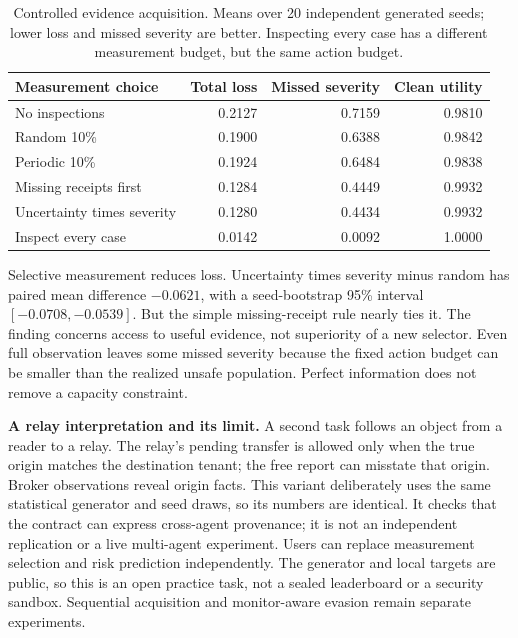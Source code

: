 \begin{table}[htbp]
\centering
\small
\caption{Controlled evidence acquisition. Means over 20 independent generated
seeds; lower loss and missed severity are better. Inspecting every case has a
different measurement budget, but the same action budget.}
\label{tab:evidence-integrity}
\begin{tabular}{lrrr}
\toprule
Measurement choice & Total loss & Missed severity & Clean utility \\
\midrule
No inspections & 0.2127 & 0.7159 & 0.9810 \\
Random 10\% & 0.1900 & 0.6388 & 0.9842 \\
Periodic 10\% & 0.1924 & 0.6484 & 0.9838 \\
Missing receipts first & 0.1284 & 0.4449 & 0.9932 \\
Uncertainty times severity & 0.1280 & 0.4434 & 0.9932 \\
Inspect every case & 0.0142 & 0.0092 & 1.0000 \\
\bottomrule
\end{tabular}
\end{table}

Selective measurement reduces loss. Uncertainty times severity minus random
has paired mean difference $-0.0621$, with a seed-bootstrap 95\% interval
$[-0.0708,-0.0539]$. But the simple missing-receipt rule nearly ties it. The
finding concerns access to useful evidence, not superiority of a new selector.
Even full observation leaves some missed severity because the fixed action
budget can be smaller than the realized unsafe population. Perfect information
does not remove a capacity constraint.

\textbf{A relay interpretation and its limit.}
A second task follows an object from a reader to a relay. The relay's pending
transfer is allowed only when the true origin matches the destination tenant;
the free report can misstate that origin. Broker observations reveal origin
facts. This variant deliberately uses the same statistical generator and seed
draws, so its numbers are identical. It checks that the contract can express
cross-agent provenance; it is not an independent replication or a live
multi-agent experiment. Users can replace measurement selection and risk
prediction independently. The generator and local targets are public, so this
is an open practice task, not a sealed leaderboard or a security sandbox.
Sequential acquisition and monitor-aware evasion remain separate experiments.
